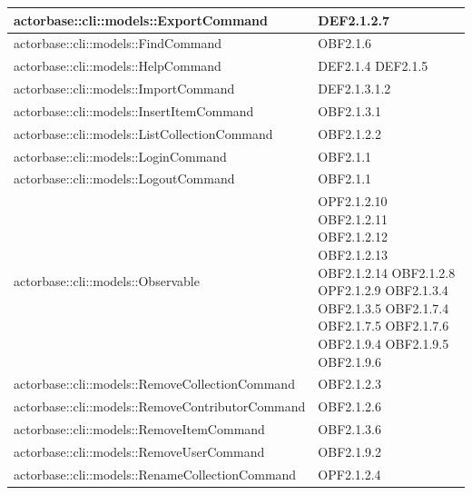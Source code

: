 \documentclass{scalatekids-article}
\begin{document}
\begin{longtable}[H]{|p{11.5cm}|p{5.5cm}|}
\hline
actorbase::cli::models::ExportCommand & \multiLineCell[t]{DEF2.1.2.7\\}\\
\hline
actorbase::cli::models::FindCommand & \multiLineCell[t]{OBF2.1.6\\}\\
\hline
actorbase::cli::models::HelpCommand & \multiLineCell[t]{DEF2.1.4 DEF2.1.5\\}\\
\hline
actorbase::cli::models::ImportCommand & \multiLineCell[t]{DEF2.1.3.1.2\\}\\
\hline
actorbase::cli::models::InsertItemCommand & \multiLineCell[t]{OBF2.1.3.1\\}\\
\hline
actorbase::cli::models::ListCollectionCommand & \multiLineCell[t]{OBF2.1.2.2\\}\\
\hline
actorbase::cli::models::LoginCommand & \multiLineCell[t]{OBF2.1.1\\}\\
\hline
actorbase::cli::models::LogoutCommand & \multiLineCell[t]{OBF2.1.1\\}\\
\hline
actorbase::cli::models::Observable & \multiLineCell[t]{OPF2.1.2.10 OBF2.1.2.11\\OBF2.1.2.12 OBF2.1.2.13\\OBF2.1.2.14 OBF2.1.2.8\\OPF2.1.2.9 OBF2.1.3.4\\OBF2.1.3.5 OBF2.1.7.4\\OBF2.1.7.5 OBF2.1.7.6\\OBF2.1.9.4 OBF2.1.9.5\\OBF2.1.9.6}\\
\hline
actorbase::cli::models::RemoveCollectionCommand & \multiLineCell[t]{OBF2.1.2.3\\}\\
\hline
actorbase::cli::models::RemoveContributorCommand & \multiLineCell[t]{OBF2.1.2.6\\}\\
\hline
actorbase::cli::models::RemoveItemCommand & \multiLineCell[t]{OBF2.1.3.6\\}\\
\hline
actorbase::cli::models::RemoveUserCommand & \multiLineCell[t]{OBF2.1.9.2\\}\\
\hline
actorbase::cli::models::RenameCollectionCommand & \multiLineCell[t]{OPF2.1.2.4\\}\\

\end{longtable}
\end{document}
